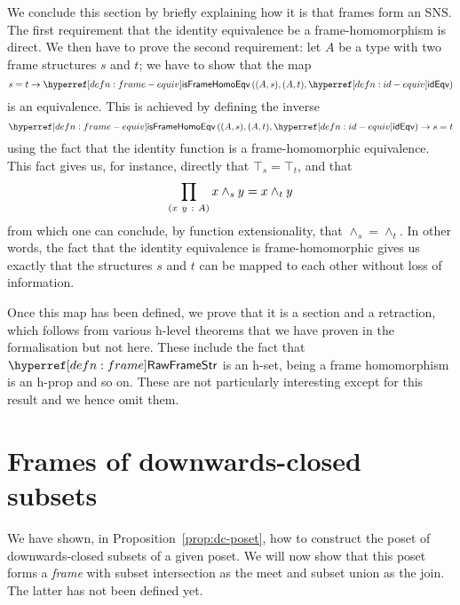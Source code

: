 We conclude this section by briefly explaining how it is that frames form an SNS. The
first requirement that the identity equivalence be a frame-homomorphism is direct. We
then have to prove the second requirement: let $A$ be a type with two frame structures
$s$ and $t$; we have to show that the map
\begin{equation*}
  s = t \rightarrow \isframehomoeqv{(A, s), (A, t), \idequivnm{}}
\end{equation*}
is an equivalence. This is achieved by defining the inverse
\begin{equation*}
  \isframehomoeqv{(A, s), (A, t), \idequivnm{}} \rightarrow s = t
\end{equation*}
using the fact that the identity function is a frame-homomorphic equivalence. This fact
gives us, for instance, directly that $\top_s = \top_t$, and that
\begin{equation*}
  \prod_{(x~y~:~A)} x \wedge_s y = x \wedge_t y
\end{equation*}
from which one can conclude, by function extensionality, that $\wedge_s = \wedge_t$. In other words,
the fact that the identity equivalence is frame-homomorphic gives us exactly that the
structures $s$ and $t$ can be mapped to each other without loss of information.

Once this map has been defined, we prove that it is a section and a retraction, which
follows from various h-level theorems that we have proven in the \veragda{} formalisation
but not here. These include the fact that $\rawframestrnm{}$ is an h-set, being a frame
homomorphism is an h-prop and so on. These are not particularly interesting except for
this result and we hence omit them.

\section{Frames of downwards-closed subsets}\label{sec:down-set-frame}

We have shown, in Proposition~\ref{prop:dc-poset}, how to construct the poset of
downwards-closed subsets of a given poset. We will now show that this poset forms a
\emph{frame} with subset intersection as the meet and subset union as the join. The latter
has not been defined yet.

